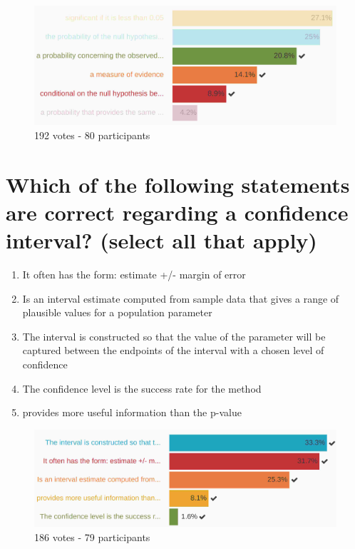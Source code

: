 \documentclass[letterpaper,10pt,twoside,printwatermark=false]{pinp}
\providecommand{\tightlist}{%
  \setlength{\itemsep}{0pt}\setlength{\parskip}{0pt}}
\begin{document}
\begin{figure}[H]
  \begin{center}
    \includegraphics[scale=0.11]{q9.jpg} 
  \end{center}
  \caption{192 votes - 80 participants}
\end{figure}

\section{Which of the following statements are correct regarding a
confidence interval? (select all that
apply)}\label{which-of-the-following-statements-are-correct-regarding-a-confidence-interval-select-all-that-apply}

\begin{enumerate}
\def\labelenumi{\arabic{enumi}.}
\tightlist
\item
  It often has the form: estimate +/- margin of error
\item
  Is an interval estimate computed from sample data that gives a range
  of plausible values for a population parameter
\item
  The interval is constructed so that the value of the parameter will be
  captured between the endpoints of the interval with a chosen level of
  confidence
\item
  The confidence level is the success rate for the method
\item
  provides more useful information than the p-value
\end{enumerate}

\begin{figure}[H]
  \begin{center}
    \includegraphics[scale=0.11]{q10.jpg} 
  \end{center}
  \caption{186 votes - 79 participants}
\end{figure}





\end{document}
